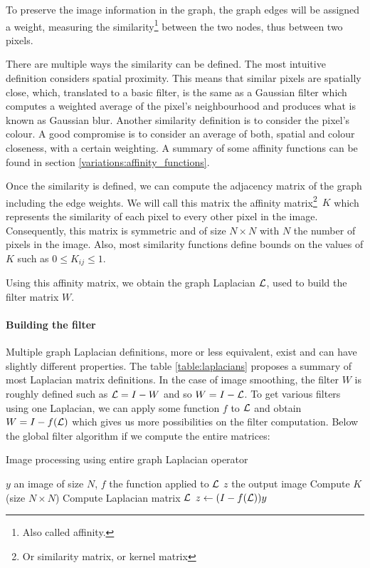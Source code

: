 To preserve the image information in the graph, the graph edges will be assigned a weight, measuring the similarity\footnote{Also called affinity.} between the two nodes, thus between two pixels.

There are multiple ways the similarity can be defined.
The most intuitive definition considers spatial proximity.
This means that similar pixels are spatially close, which, translated to a basic filter, is the same as a Gaussian filter which computes a weighted average of the pixel's neighbourhood and produces what is known as Gaussian blur.
Another similarity definition is to consider the pixel's colour.
A good compromise is to consider an average of both, spatial and colour closeness, with a certain weighting.
A summary of some affinity functions can be found in section \ref{variations:affinity_functions}.

Once the similarity is defined, we can compute the adjacency matrix of the graph including the edge weights.
We will call this matrix the affinity matrix\footnote{Or similarity matrix, or kernel matrix}\ \(K\) which represents the similarity of each pixel to every other pixel in the image.
Consequently, this matrix is symmetric and of size \(N \times N\) with \(N\) the number of pixels in the image.
Also, most similarity functions define bounds on the values of \(K\) such as \(0 \le K_{ij} \le 1\).

Using this affinity matrix, we obtain the graph Laplacian \(\operatorname{\mathcal{L}}\), used to build the filter matrix \(W\).

\paragraph{Building the filter}

Multiple graph Laplacian definitions, more or less equivalent, exist and can have slightly different properties.
The table \ref{table:laplacians} proposes a summary of most Laplacian matrix definitions.
In the case of image smoothing, the filter \(W\) is roughly defined such as \(\operatorname{\mathcal{L}} = I - W\) \cite{siam_slides_2016} and so \(W = I - \operatorname{\mathcal{L}}\).
To get various filters using one Laplacian, we can apply some function \(f\) to \(\operatorname{\mathcal{L}}\) and obtain \(W = I - f(\operatorname{\mathcal{L}})\) which gives us more possibilities on the filter computation.
Below the global filter algorithm if we compute the entire matrices:

\begin{algorithm}[H]
 \caption{Image processing using entire graph Laplacian operator}
 \begin{algorithmic}
  \REQUIRE \(y\) an image of size \(N\), \(f\) the function applied to \(\operatorname{\mathcal{L}}\)
  \ENSURE \(z\) the output image
  \STATE Compute \(K\) (size \(N \times N\))
  \STATE Compute Laplacian matrix \(\operatorname{\mathcal{L}}\)
  \STATE \(z \leftarrow (I - f(\operatorname{\mathcal{L}})) y\)
 \end{algorithmic}
\end{algorithm}


